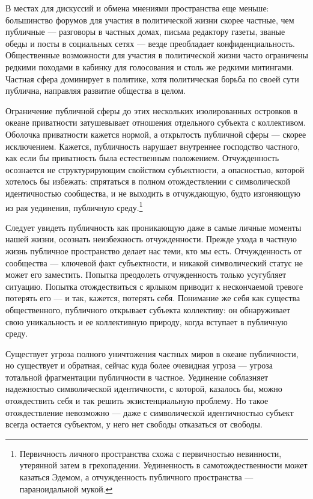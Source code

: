 \documentclass[12pt]{book}
\begin{document}
В местах для дискуссий и обмена мнениями пространства еще меньше: большинство форумов для участия в политической жизни скорее частные, чем публичные --- разговоры в частных домах, письма редактору газеты, званые обеды и посты в социальных сетях --- везде преобладает конфиденциальность. Общественные возможности для участия в политической жизни часто ограничены редкими походами в кабинку для голосования и столь же редкими митингами. Частная сфера доминирует в политике, хотя политическая борьба по своей сути публична, направляя развитие общества в целом.

Ограничение публичной сферы до этих нескольких изолированных островков в океане приватности затушевывает отношения отдельного субъекта с коллективом. Оболочка приватности кажется нормой, а открытость публичной сферы --- скорее исключением. Кажется, публичность нарушает внутреннее господство частного, как если бы приватность была естественным положением. Отчужденность осознается не структурирующим свойством субъектности, а опасностью, которой хотелось бы избежать: спрятаться в полном отождествлении с символической идентичностью сообщества, и не выходить в отчуждающую, будто изгоняющую из рая уединения, публичную среду.\footnote{Первичность личного пространства схожа с первичностью невинности, утерянной затем в грехопадении. Уединенность в самотождественности может казаться Эдемом, а отчужденность публичного пространства --- параноидальной мукой.}

Следует увидеть публичность как проникающую даже в самые личные моменты нашей жизни, осознать неизбежность отчужденности. Прежде ухода в частную жизнь публичное пространство делает нас теми, кто мы есть. Отчужденность от сообщества --- ключевой факт субъектности, и никакой символический статус не может его заместить. Попытка преодолеть отчужденность только усугубляет ситуацию. Попытка отождествиться с ярлыком приводит к нескончаемой тревоге потерять его --- и так, кажется, потерять себя. Понимание же себя как существа общественного, публичного открывает субъекта коллективу: он обнаруживает свою уникальность и ее коллективную природу, когда вступает в публичную среду.

Существует угроза полного уничтожения частных миров в океане публичности, но существует и обратная, сейчас куда более очевидная угроза --- угроза тотальной фрагментации публичности в частное. Уединение соблазняет надежностью символической идентичности, с которой, казалось бы, можно отождествить себя и так решить экзистенциальную проблему. Но такое отождествление невозможно --- даже с символической идентичностью субъект всегда остается субъектом, у него нет свободы отказаться от свободы.
\end{document}
